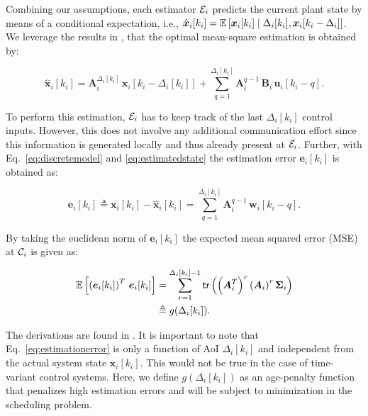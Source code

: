 Combining our assumptions, each estimator $\mathcal{E}_i$ predicts the current
plant state by means of a conditional expectation, i.e.,
$\hat{\boldsymbol{x}}_i[k_i] = \mathbb{E}\left[\boldsymbol{x}_i[k_i] \mid \Delta_i[k_i],
\boldsymbol{x}_i[k_i-\Delta_i] \right]$. We leverage the results in
\cite{ayan2019age}, that the optimal mean-square estimation is obtained by:

\begin{equation}
  \label{eq:estimatedstate}
    \boldsymbol{\hat{x}}_i[k_i] = \boldsymbol{A}_i^{\Delta_i[k_i]} \,  \boldsymbol{x}_i[k_i - \Delta_i[k_i]] + \sum_{q=1}^{\Delta_i[k_i]} \boldsymbol{A}_i^{q - 1} \, \boldsymbol{B}_i \, \boldsymbol{u}_i [k_i - q].
\end{equation}

To perform this estimation, $\mathcal{E}_i$ has to keep track of the last
$\Delta_i[k_i]$ control inputs. However, this does not involve any additional
communication effort since this information is generated locally and thus
already present at $\mathcal{E}_i$. Further, with Eq.~\eqref{eq:discretemodel} and
\eqref{eq:estimatedstate} the estimation error $\boldsymbol{e}_i[k_i]$ is
obtained as:

\begin{equation}
  \boldsymbol{e}_i[k_i] \triangleq \boldsymbol{x}_i[k_i] - \boldsymbol{\hat{x}}_i[k_i] = \sum_{q=1}^{\Delta_i[k_i]} \boldsymbol{A}_i^{q-1} \, \boldsymbol{w}_i[k_i - q].
\end{equation}

By taking the euclidean norm of $\boldsymbol{e}_i[k_i]$ the expected mean
squared error (MSE) at $\mathcal{C}_i$ is given as:

\begin{align}
  \label{eq:estimationerror}
  \mathbb{E} \left[ \left(\boldsymbol{e}_i[k_i]\right)^T \, \boldsymbol{e}_i[k_i]\right] & = \sum_{r=1}^{\Delta_i[k_i] - 1} \mathsf{tr} \left( \left(\boldsymbol{A}_i^T\right)^r  \left(\boldsymbol{A}_i \right)^r \boldsymbol{\Sigma}_i \right) \\ \nonumber
  & \triangleq g(\Delta_i[k_i]).
\end{align}

The derivations are found in \cite{ayan2019age}. It is important to note that
Eq.~\eqref{eq:estimationerror} is only a function of AoI $\Delta_i[k_i]$ and
independent from the actual system state $\boldsymbol{x}_i[k_i]$. This would not
be true in the case of time-variant control systems. Here, we define
$g(\Delta_i[k_i])$ as an age-penalty function that penalizes high estimation
errors and will be subject to minimization in the scheduling problem. 

